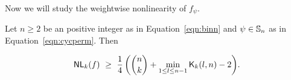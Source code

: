 \documentclass{llncs}
\begin{document}
Now we will study the weightwise nonlinearity of $f_\psi$.
\iffalse
\begin{lemma} \label{lem:setSize_k}
For $n \geq 2$ as in Equation~\ref{eqn:binn}, let $\psi \in \Sn$ be the permutation as defined in Equation~\ref{eqn:cycperm}.Then 
$$\left| \{x \in \Ekn{n}{k} \setminus \orbs_o : c \cdot (x + \psi(x))= 1\} \right| 
= \frac{1}{2} (|\Ekn{n}{k}| - \kraw{k}{l}{n})$$
where $l = \w(c+\psi^{-1}(c))$.
\end{lemma}
\begin{proof}
Let $x = (x_1,x_2, \ldots,x_n) \in \Ekn{n}{k}$ and $c = (c_1,c_2,\ldots,c_n) \in \F_2^n$. Then as in Equation~\ref{eqn:cx2}, we have 
\begin{eqnarray*}
c \cdot (x+\psi(x)) & = & (c+\psi^{-1}(c)) \cdot x \label{eqn:cxk2}
\end{eqnarray*}
is a linear function on $n$ variable defined over the slice $\Ekn{n}{k}$.
Therefore, using Theorem~\ref{thm:Kraw}, we have
$$\left| \{x \in \Ekn{n}{k} : c \cdot (x + \psi(x))= 1\} \right| = \wkn{n}{k}((c+\psi^{-1}(c)) \cdot x) = \frac{1}{2} (|\Ekn{n}{k}| - \kraw{k}{l}{n})$$
where $l = \w(c+\psi^{-1}(c))$.
If $x \in \Ekn{n}{k}$ and $|\orbs_\psi(x)| = 1$ i.e., $x \in \Ekn{n}{k} \cap \orbs_o$ then $c \cdot (x+\psi(x)) = 0$. Hence,
$$\left| \{x \in \Ekn{n}{k} \setminus \orbs_o : c \cdot (x + \psi(x))= 1\} \right| 
= \frac{1}{2} (|\Ekn{n}{k}| - \kraw{k}{l}{n}).$$
\end{proof}
\fi
\begin{theorem}
Let $n \geq 2$ be an positive integer as in Equation~\ref{eqn:binn} and $\psi \in \Sn$ as in Equation~\ref{eqn:cycperm}.
Then 
\iffalse
$$\NLk{k}(f) ~\geq ~ 
\left\{ \begin{array}{ll}
\displaystyle{\frac{1}{4}\left({n \choose k} + \min_{0 \leq l \leq n} \kraw{k}{l}{n}\right)}  & \text{ if }  k \not\preceq n \\
\displaystyle{\frac{1}{4}\left({n \choose k} + \min_{0 \leq l \leq n} \kraw{k}{l}{n} - 2\right)} & \text{ if } k \preceq n.
\end{array}   \right.$$
\fi
$$\mathsf{NL}_{k}(f) ~\geq ~ 
\displaystyle{\frac{1}{4}\left({n \choose k} + \min_{1 \leq l \leq n-1} \mathsf{K}_{k}(l,n)-2\right)}.$$
\end{theorem}
\iffalse
\end{document}
